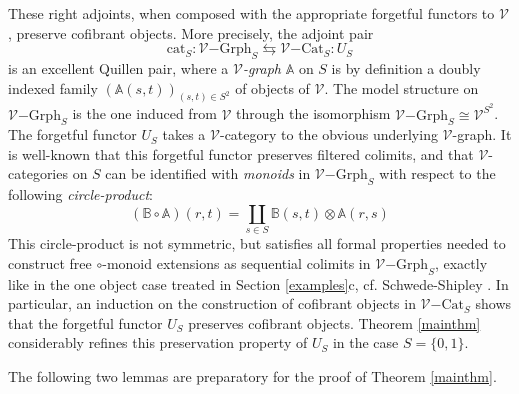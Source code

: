 \documentclass[10pt]{amsart}
\theoremstyle{plain}
\theoremstyle{remark}
\def\Vv{\mathcal{V}}
\def\Cat{\mathrm{Cat}}
\def\VCat{\Vv\mathrm{-}\Cat}
\def\VGrph{\Vv\mathrm{-Grph}}
\def\cat{\mathrm{cat}}
\def\AA{\mathbb{A}}
\def\BB{\mathbb{B}}
\def\lra{\leftrightarrows}
\begin{document}
These right adjoints, when composed with the appropriate forgetful functors to $\Vv$, preserve cofibrant objects. More precisely, the adjoint pair $$\cat_S:\VGrph_S\lra\VCat_S:U_S$$ is an excellent Quillen pair, where a \emph{$\Vv$-graph} $\AA$ on $S$ is  by definition a doubly indexed family $(\AA(s,t))_{(s,t)\in S^2}$ of objects of $\Vv$. The model structure on $\VGrph_S$ is the one induced from $\Vv$ through the isomorphism $\VGrph_S\cong\Vv^{S^2}$. The forgetful functor $U_S$ takes a $\Vv$-category to the obvious underlying $\Vv$-graph. It is well-known that this forgetful functor preserves filtered colimits, and that $\Vv$-categories on $S$ can be identified with \emph{monoids} in $\VGrph_S$ with respect to the following \emph{circle-product}:$$(\BB\circ\AA)(r,t)=\coprod_{s\in S}\BB(s,t)\otimes\AA(r,s)$$This circle-product is not symmetric, but satisfies all formal properties needed to construct free $\circ$-monoid extensions as sequential colimits in $\VGrph_S$, exactly like in the one object case treated in Section \ref{examples}c, cf. Schwede-Shipley \cite[Section 6.2]{SS2}. In particular, an induction on the construction of cofibrant objects in $\VCat_S$ shows that the forgetful functor $U_S$ preserves cofibrant objects. Theorem \ref{mainthm} considerably refines this preservation property of $U_S$ in the case $S=\{0,1\}$.\vspace{1ex}


The following two lemmas are preparatory for the proof of Theorem \ref{mainthm}.
\end{document}

